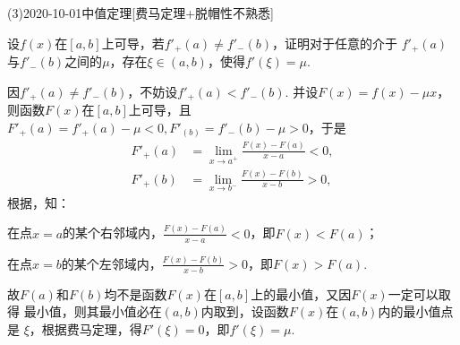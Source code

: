 \documentclass{ctexart}
\begin{document}
\begin{mathques}(3){2020-10-01}{中值定理}[费马定理+脱帽性不熟悉]
\begin{ques}
  设$f(x)$在$[a, b]$上可导，若$f'_+(a) \neq f'_-(b)$，证明对于任意的介于
  $f'_+(a)$与$f'_-(b)$之间的$\mu$，存在$\xi \in (a, b)$，使得$f'(\xi) = \mu$.
\end{ques}
\begin{solu}
  \mathproof 因$f'_+(a) \neq f'_-(b)$，不妨设$f'_+(a) < f'_-(b)$. 并设$F(x) =
  f(x) - \mu x$，则函数$F(x)$在$[a, b]$上可导，且$F'_+(a) = f'_+(a) - \mu < 0,
  F'_(b) = f'_-(b) - \mu > 0$，于是
  \begin{align*}
    F'_+(a) &= \lim_{x \to a^+} \frac{F(x) - F(a)}{x - a} < 0,\\
    F'_+(b) &= \lim_{x \to b^-} \frac{F(x) - F(b)}{x - b} > 0,
  \end{align*}
  根据，知：
  {\ccwd\par
    在点$x=a$的某个右邻域内，$\frac{F(x) - F(a)}{x - a} < 0$，即$F(x) < F(a)$；
    \vspace{1em}

    在点$x=b$的某个左邻域内，$\frac{F(x) - F(b)}{x - b} > 0$，即$F(x) > F(a)$.
  }

  故$F(a)$和$F(b)$均不是函数$F(x)$在$[a, b]$上的最小值，又因$F(x)$一定可以取得
  最小值，则其最小值必在$(a, b)$内取到，设函数$F(x)$在$(a, b)$内的最小值点是
  $\xi$，根据费马定理，得$F'(\xi) = 0$，即$f'(\xi) = \mu$.
\end{solu}
\end{mathques}
\end{document}
